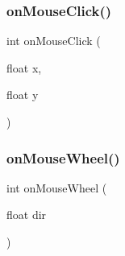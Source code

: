 \mbox{\label{group___event_manager_gaab01ff33aa8808c2f3e37120bb6bf881}} 
\subsubsection{\texorpdfstring{on\+Mouse\+Click()}{onMouseClick()}}
{\footnotesize\ttfamily int on\+Mouse\+Click (\begin{DoxyParamCaption}\item[{float}]{x,  }\item[{float}]{y }\end{DoxyParamCaption})}

\mbox{\label{group___event_manager_ga258410971167dcb64eef4d4653a33efc}} 
\subsubsection{\texorpdfstring{on\+Mouse\+Wheel()}{onMouseWheel()}}
{\footnotesize\ttfamily int on\+Mouse\+Wheel (\begin{DoxyParamCaption}\item[{float}]{dir }\end{DoxyParamCaption})}

